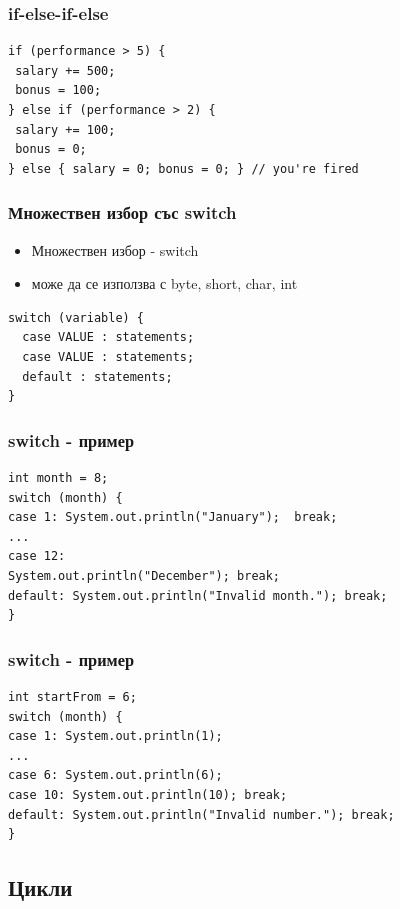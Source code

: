 \documentclass{beamer}
\begin{document}
\begin{frame}[fragile]
  \frametitle{if-else-if-else}
  \transdissolve
\begin{lstlisting}
if (performance > 5) {
 salary += 500;
 bonus = 100;
} else if (performance > 2) {
 salary += 100;
 bonus = 0;
} else { salary = 0; bonus = 0; } // you're fired
\end{lstlisting}
\end{frame}

\begin{frame}[fragile]
  \frametitle{Множествен избор със switch}
  \transdissolve
  \begin{itemize}
  \item Множествен избор - switch
  \item може да се
    използва с byte, short, char, int
  \end{itemize}
  \begin{lstlisting}
switch (variable) {
  case VALUE : statements;
  case VALUE : statements;
  default : statements;
}
  \end{lstlisting}
\end{frame}

\begin{frame}[fragile]
  \transdissolve
  \frametitle{switch - пример}
\begin{lstlisting}
int month = 8;
switch (month) {
case 1: System.out.println("January");  break;
...
case 12:
System.out.println("December"); break;
default: System.out.println("Invalid month."); break;
}
\end{lstlisting}
\end{frame}

\begin{frame}[fragile]
  \frametitle{switch - пример}
  \transdissolve
\begin{lstlisting}
int startFrom = 6;
switch (month) {
case 1: System.out.println(1);
...
case 6: System.out.println(6);
case 10: System.out.println(10); break;
default: System.out.println("Invalid number."); break;
}
\end{lstlisting}
\end{frame}

\subsection{Цикли}
\end{document}
